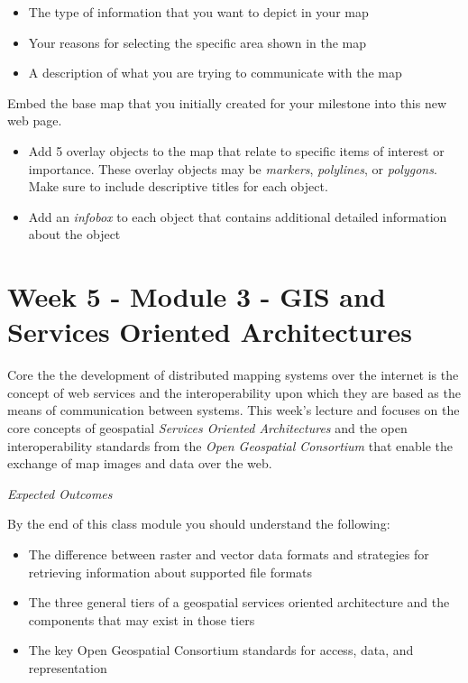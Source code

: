 \documentclass[]{book}
\providecommand{\tightlist}{%
  \setlength{\itemsep}{0pt}\setlength{\parskip}{0pt}}
\begin{document}
\begin{itemize}
\tightlist
\item
  The type of information that you want to depict in your map
\item
  Your reasons for selecting the specific area shown in the map
\item
  A description of what you are trying to communicate with the map
\end{itemize}

Embed the base map that you initially created for your milestone into
this new web page.

\begin{itemize}
\tightlist
\item
  Add 5 overlay objects to the map that relate to specific items of
  interest or importance. These overlay objects may be \emph{markers},
  \emph{polylines}, or \emph{polygons}. Make sure to include descriptive
  titles for each object.
\item
  Add an \emph{infobox} to each object that contains additional detailed
  information about the object
\end{itemize}

\chapter{Week 5 - Module 3 - GIS and Services Oriented
Architectures}\label{week05}

Core the the development of distributed mapping systems over the
internet is the concept of web services and the interoperability upon
which they are based as the means of communication between systems. This
week's lecture and focuses on the core concepts of geospatial
\emph{Services Oriented Architectures} and the open interoperability
standards from the \emph{Open Geospatial Consortium} that enable the
exchange of map images and data over the web.

\emph{Expected Outcomes}

By the end of this class module you should understand the following:

\begin{itemize}
\item
  The difference between raster and vector data formats and strategies
  for retrieving information about supported file formats
\item
  The three general tiers of a geospatial services oriented architecture
  and the components that may exist in those tiers
\item
  The key Open Geospatial Consortium standards for access, data, and
  representation
\end{itemize}
\end{document}
